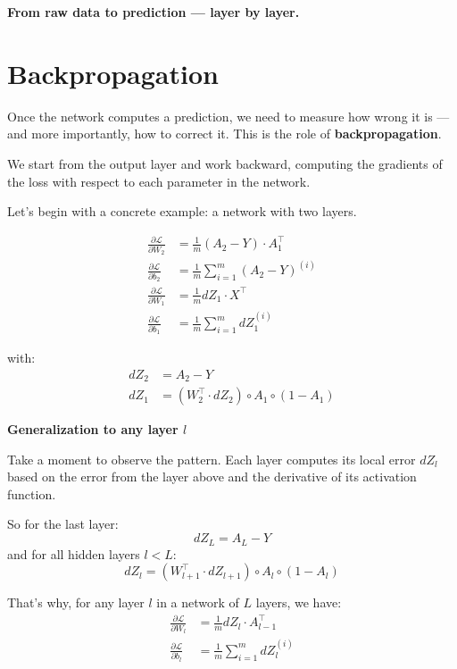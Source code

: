 \documentclass[11pt]{article}
\begin{document}
\vspace{2em}
\begin{center}
\LARGE \textbf{From raw data to prediction — layer by layer.}
\end{center}


\section*{Backpropagation}

Once the network computes a prediction, we need to measure how wrong it is — and more importantly, how to correct it.  
This is the role of \textbf{backpropagation}.

\bigskip

We start from the output layer and work backward, computing the gradients of the loss with respect to each parameter in the network.

\bigskip

Let’s begin with a concrete example: a network with two layers.

\[
\begin{aligned}
\frac{\partial \mathcal{L}}{\partial W_2} &= \frac{1}{m} (A_2 - Y) \cdot A_1^\top \\
\frac{\partial \mathcal{L}}{\partial b_2} &= \frac{1}{m} \sum_{i=1}^m (A_2 - Y)^{(i)} \\
\frac{\partial \mathcal{L}}{\partial W_1} &= \frac{1}{m} dZ_1 \cdot X^\top \\
\frac{\partial \mathcal{L}}{\partial b_1} &= \frac{1}{m} \sum_{i=1}^m dZ_1^{(i)}
\end{aligned}
\]

with:
\[
\begin{aligned}
dZ_2 &= A_2 - Y \\
dZ_1 &= (W_2^\top \cdot dZ_2) \circ A_1 \circ (1 - A_1)
\end{aligned}
\]

\bigskip

\textbf{Generalization to any layer $l$}

Take a moment to observe the pattern.  
Each layer computes its local error $dZ_l$ based on the error from the layer above and the derivative of its activation function.

\medskip

So for the last layer:
\[
dZ_L = A_L - Y
\]
and for all hidden layers $l < L$:
\[
dZ_l = (W_{l+1}^\top \cdot dZ_{l+1}) \circ A_l \circ (1 - A_l)
\]

\bigskip

That’s why, for any layer $l$ in a network of $L$ layers, we have:
\[
\begin{aligned}
\frac{\partial \mathcal{L}}{\partial W_l} &= \frac{1}{m} dZ_l \cdot A_{l-1}^\top \\
\frac{\partial \mathcal{L}}{\partial b_l} &= \frac{1}{m} \sum_{i=1}^m dZ_l^{(i)}
\end{aligned}
\]
\end{document}
